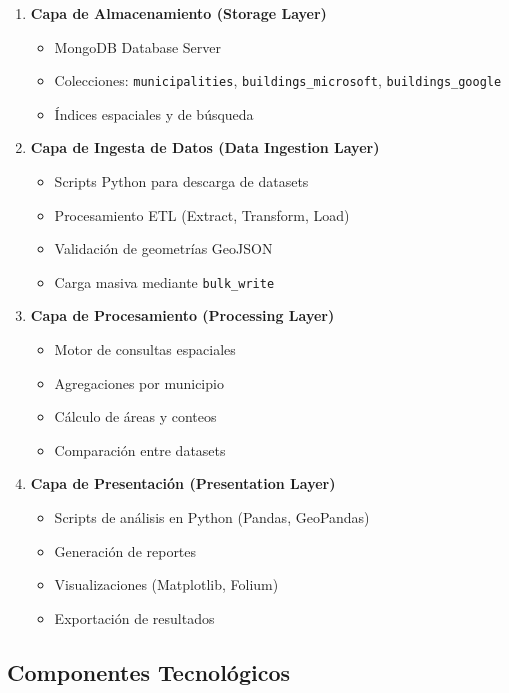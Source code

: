 \documentclass[12pt,a4paper]{article}
\begin{document}
\begin{enumerate}[leftmargin=*]
    \item \textbf{Capa de Almacenamiento (Storage Layer)}
    \begin{itemize}
        \item MongoDB Database Server
        \item Colecciones: \texttt{municipalities}, \texttt{buildings\_microsoft}, \texttt{buildings\_google}
        \item Índices espaciales y de búsqueda
    \end{itemize}
    
    \item \textbf{Capa de Ingesta de Datos (Data Ingestion Layer)}
    \begin{itemize}
        \item Scripts Python para descarga de datasets
        \item Procesamiento ETL (Extract, Transform, Load)
        \item Validación de geometrías GeoJSON
        \item Carga masiva mediante \texttt{bulk\_write}
    \end{itemize}
    
    \item \textbf{Capa de Procesamiento (Processing Layer)}
    \begin{itemize}
        \item Motor de consultas espaciales
        \item Agregaciones por municipio
        \item Cálculo de áreas y conteos
        \item Comparación entre datasets
    \end{itemize}
    
    \item \textbf{Capa de Presentación (Presentation Layer)}
    \begin{itemize}
        \item Scripts de análisis en Python (Pandas, GeoPandas)
        \item Generación de reportes
        \item Visualizaciones (Matplotlib, Folium)
        \item Exportación de resultados
    \end{itemize}
\end{enumerate}

\subsection{Componentes Tecnológicos}
\end{document}
